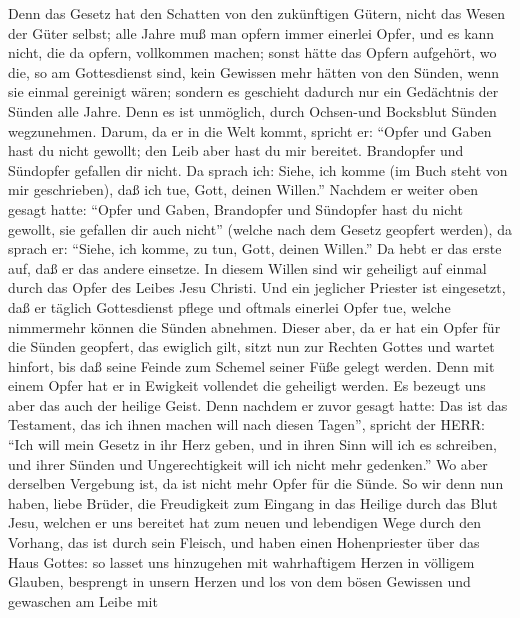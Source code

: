  Denn das Gesetz hat den Schatten von den zukünftigen
Gütern, nicht das Wesen der Güter selbst; alle Jahre muß man opfern
immer einerlei Opfer, und es kann nicht, die da opfern, vollkommen
machen;  sonst hätte das Opfern aufgehört, wo die, so am
Gottesdienst sind, kein Gewissen mehr hätten von den Sünden, wenn sie
einmal gereinigt wären;  sondern es geschieht dadurch nur
ein Gedächtnis der Sünden alle Jahre.  Denn es ist
unmöglich, durch Ochsen-und Bocksblut Sünden wegzunehmen. 
Darum, da er in die Welt kommt, spricht er: ``Opfer und Gaben hast du
nicht gewollt; den Leib aber hast du mir bereitet. 
Brandopfer und Sündopfer gefallen dir nicht.  Da sprach ich:
Siehe, ich komme (im Buch steht von mir geschrieben), daß ich tue, Gott,
deinen Willen.''  Nachdem er weiter oben gesagt hatte:
``Opfer und Gaben, Brandopfer und Sündopfer hast du nicht gewollt, sie
gefallen dir auch nicht'' (welche nach dem Gesetz geopfert werden),
 da sprach er: ``Siehe, ich komme, zu tun, Gott, deinen
Willen.'' Da hebt er das erste auf, daß er das andere einsetze.
 In diesem Willen sind wir geheiligt auf einmal durch das
Opfer des Leibes Jesu Christi.  Und ein jeglicher Priester
ist eingesetzt, daß er täglich Gottesdienst pflege und oftmals einerlei
Opfer tue, welche nimmermehr können die Sünden abnehmen. 
Dieser aber, da er hat ein Opfer für die Sünden geopfert, das ewiglich
gilt, sitzt nun zur Rechten Gottes  und wartet hinfort, bis
daß seine Feinde zum Schemel seiner Füße gelegt werden. 
Denn mit einem Opfer hat er in Ewigkeit vollendet die geheiligt werden.
 Es bezeugt uns aber das auch der heilige Geist. Denn
nachdem er zuvor gesagt hatte:  Das ist das Testament, das
ich ihnen machen will nach diesen Tagen'', spricht der HERR: ``Ich will
mein Gesetz in ihr Herz geben, und in ihren Sinn will ich es schreiben,
 und ihrer Sünden und Ungerechtigkeit will ich nicht mehr
gedenken.''  Wo aber derselben Vergebung ist, da ist nicht
mehr Opfer für die Sünde.  So wir denn nun haben, liebe
Brüder, die Freudigkeit zum Eingang in das Heilige durch das Blut Jesu,
 welchen er uns bereitet hat zum neuen und lebendigen Wege
durch den Vorhang, das ist durch sein Fleisch,  und haben
einen Hohenpriester über das Haus Gottes:  so lasset uns
hinzugehen mit wahrhaftigem Herzen in völligem Glauben, besprengt in
unsern Herzen und los von dem bösen Gewissen und gewaschen am Leibe mit
